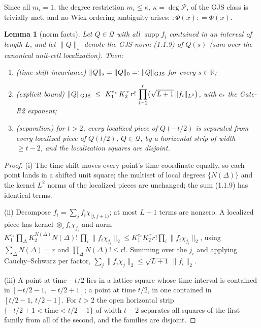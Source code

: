 \documentclass[11pt,a4paper]{article}
\theoremstyle{plain}
\newtheorem{lemma}[theorem]{Lemma}
\theoremstyle{definition}
\newcommand{\R}{\mathbb{R}}
\newcommand{\Q}{\mathcal{Q}}
\DeclareMathOperator{\supp}{supp}
\begin{document}
Since all $m_i=1$, the degree restriction $m_i\le\kappa$, $\kappa=\deg\mathscr P$, of the GJS
class is trivially met, and no Wick ordering ambiguity arises: ${:}\Phi(x){:}=\Phi(x)$.

\begin{lemma}[norm facts]\label{lem:norm}
Let $Q\in\Q$ with all $\supp f_i$ contained in an interval of length $L$, and let
$\|Q\|_s$ denote the GJS norm (1.1.9) of $Q(s)$ (sum over the canonical unit-cell localization).
Then:
\begin{enumerate}
\item[\rm(i)] \emph{(time-shift invariance)} $\|Q\|_s=\|Q\|_0=:\|Q\|_{\rm GJS}$ for every
      $s\in\R$;
\item[\rm(ii)] \emph{(explicit bound)}
      $\displaystyle \|Q\|_{\rm GJS}\ \le\ K_1^{e_*}\,K_2^{\,r}\,r!\,\prod_{i=1}^r
      \bigl(\sqrt{L+1}\,\|f_i\|_{L^2}\bigr)$, with $e_*$ the Gate-R2 exponent;
\item[\rm(iii)] \emph{(separation)} for $t>2$, every localized piece of $Q(-t/2)$ is separated
      from every localized piece of $\tilde Q(t/2)$, $\tilde Q\in\Q$, by a horizontal strip of
      width $\ge t-2$, and the localization squares are disjoint.
\end{enumerate}
\end{lemma}

\begin{proof}
(i) The time shift moves every point's time coordinate equally, so each point lands in a shifted
unit square; the multiset of local degrees $\{N(\Delta)\}$ and the kernel $L^2$ norms of the
localized pieces are unchanged; the sum (1.1.9) has identical terms.

(ii) Decompose $f_i=\sum_{j}f_i\chi_{[j,j+1)}$; at most $L+1$ terms are nonzero. A localized
piece has kernel $\otimes_i f_i\chi_{j_i}$ and norm
$K_1^{e_*}\prod_\Delta K_2^{N(\Delta)}N(\Delta)!\,\prod_i\|f_i\chi_{j_i}\|_2
\le K_1^{e_*}K_2^{\,r}r!\prod_i\|f_i\chi_{j_i}\|_2$, using $\sum_\Delta N(\Delta)=r$ and
$\prod_\Delta N(\Delta)!\le r!$. Summing over the $j_i$ and applying Cauchy--Schwarz per factor,
$\sum_j\|f_i\chi_j\|_2\le\sqrt{L+1}\,\|f_i\|_2$.

(iii) A point at time $-t/2$ lies in a lattice square whose time interval is contained in
$[-t/2-1,\,-t/2+1]$; a point at time $t/2$, in one contained in $[t/2-1,\,t/2+1]$. For $t>2$ the
open horizontal strip $\{-t/2+1<\text{time}<t/2-1\}$ of width $t-2$ separates all squares of the
first family from all of the second, and the families are disjoint.
\end{proof}
\end{document}
